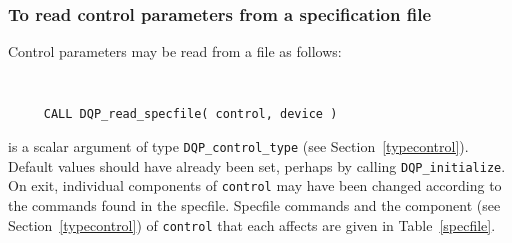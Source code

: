 \documentclass{galahad}
\newcommand{\packagename}{DQP}
\begin{document}
\subsubsection{To read control parameters from a specification file}
\label{readspec}

Control parameters may be read from a file as follows:
\hskip0.5in

\def\baselinestretch{0.8}
{\tt
\begin{verbatim}
     CALL DQP_read_specfile( control, device )
\end{verbatim}
}
\def\baselinestretch{1.0}

\begin{description}
 is a scalar \intentinout argument of type
{\tt \packagename\_control\_type}
(see Section~\ref{typecontrol}).
Default values should have already been set, perhaps by calling
{\tt \packagename\_initialize}.
On exit, individual components of {\tt control} may have been changed
according to the commands found in the specfile. Specfile commands and
the component (see Section~\ref{typecontrol}) of {\tt control}
that each affects are given in Table~\ref{specfile}.


\end{description}
\end{document}
